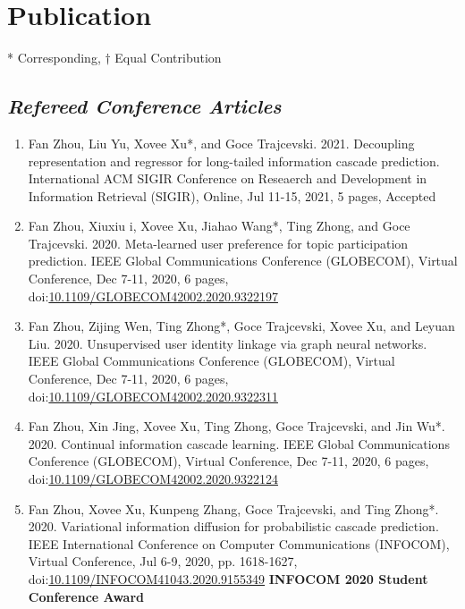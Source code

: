 
\vspace{-8pt}
\section*{Publication}
\vspace{-4pt}
\indent

* Corresponding, $\dagger$ Equal Contribution

\subsection*{\textnormal{\textit{Refereed Conference Articles}}}
\indent

\begin{enumerate}
    \item Fan Zhou, Liu Yu, Xovee Xu*, and Goce Trajcevski. 2021. Decoupling representation and regressor for long-tailed information cascade prediction. International ACM SIGIR Conference on Reseaerch and Development in Information Retrieval (SIGIR), Online, Jul 11-15, 2021, 5 pages, Accepted
    \item Fan Zhou, Xiuxiu \swashQ i, Xovee Xu, Jiahao Wang*, Ting Zhong, and Goce Trajcevski. 2020. Meta-learned user preference for topic participation prediction. IEEE Global Communications Conference (GLOBECOM), Virtual Conference, Dec 7-11, 2020, 6 pages, doi:\href{https://doi.org/10.1109/GLOBECOM42002.2020.9322197}{10.1109/GLOBECOM42002.2020.9322197}
    \item Fan Zhou, Zijing Wen, Ting Zhong*, Goce Trajcevski, Xovee Xu, and Leyuan Liu. 2020. Unsupervised user identity linkage via graph neural networks. IEEE Global Communications Conference (GLOBECOM), Virtual Conference, Dec 7-11, 2020, 6 pages, doi:\href{https://doi.org/10.1109/GLOBECOM42002.2020.9322311}{10.1109/GLOBECOM42002.2020.9322311}
    \item Fan Zhou, Xin Jing, Xovee Xu, Ting Zhong, Goce Trajcevski, and Jin Wu*. 2020. Continual information cascade learning. IEEE Global Communications Conference (GLOBECOM), Virtual Conference, Dec 7-11, 2020, 6 pages, doi:\href{https://doi.org/10.1109/GLOBECOM42002.2020.9322124}{10.1109/GLOBECOM42002.2020.9322124}
    \item Fan Zhou, Xovee Xu, Kunpeng Zhang, Goce Trajcevski, and Ting Zhong*. 2020. Variational information diffusion for probabilistic cascade prediction. IEEE International Conference on Computer Communications (INFOCOM), Virtual Conference, Jul 6-9, 2020, pp. 1618-1627, doi:\href{https://doi.org/10.1109/INFOCOM41043.2020.9155349}{10.1109/INFOCOM41043.2020.9155349}
    \newline \textbf{\color{red}INFOCOM 2020 Student Conference Award}
\end{enumerate}

